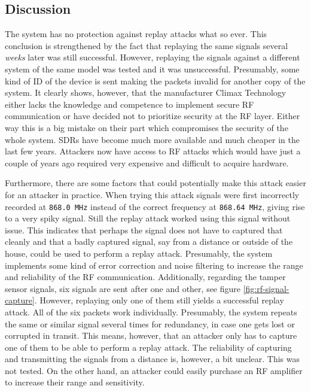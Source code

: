 \subsection{Discussion}
The system has no protection against replay attacks what so ever. This conclusion is strengthened by the fact that replaying the same signals several \textit{weeks} later was still successful. However, replaying the signals against a different system of the same model was tested and it was unsuccessful. Presumably, some kind of ID of the device is sent making the packets invalid for another copy of the system. It clearly shows, however, that the manufacturer Climax Technology either lacks the knowledge and competence to implement secure RF communication or have decided not to prioritize security at the RF layer. Either way this is a big mistake on their part which compromises the security of the whole system. SDRs have become much more available and much cheaper in the last few years. Attackers now have access to RF attacks which would have just a couple of years ago required very expensive and difficult to acquire hardware.

Furthermore, there are some factors that could potentially make this attack easier for an attacker in practice. When trying this attack signals were first incorrectly recorded at \texttt{868.0 MHz} instead of the correct frequency at \texttt{868.64 MHz}, giving rise to a very spiky signal. Still the replay attack worked using this signal without issue. This indicates that perhaps the signal does not have to captured that cleanly and that a badly captured signal, say from a distance or outside of the house, could be used to perform a replay attack. Presumably, the system implements some kind of error correction and noise filtering to increase the range and reliability of the RF communication. Additionally, regarding the tamper sensor signals, six signals are sent after one and other, see figure \ref{fig:rf-signal-capture}. However, replaying only one of them still yields a successful replay attack. All of the six packets work individually. Presumably, the system repeats the same or similar signal several times for redundancy, in case one gets lost or corrupted in transit. This means, however, that an attacker only has to capture one of them to be able to perform a replay attack. The reliability of capturing and transmitting the signals from a distance is, however, a bit unclear. This was not tested. On the other hand, an attacker could easily purchase an RF amplifier to increase their range and sensitivity.


